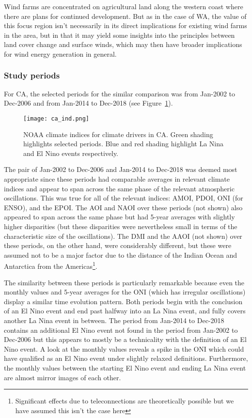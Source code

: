 Wind farms are concentrated on agricultural land along the western coast where there are plans for continued development. But as in the case of \ac{WA}, the value of this focus region isn't necessarily in its direct implications for existing wind farms in the area, but in that it may yield some insights into the principles between land cover change and surface winds, which may then have broader implications for wind energy generation in general.

\subsubsection{Study periods}
\label{sssec:period_seas_ca}

For \ac{CA}, the selected periods for the similar comparison was from Jan-2002 to Dec-2006 and from Jan-2014 to Dec-2018 (see Figure~\ref{fig:ca_ind}).

\begin{figure}[!ht]
	\centering
	\texttt{[image: ca\_ind.png]}
	\caption[CA's and SA's relevant climate indices for similar comparison]{\ac{NOAA} climate indices for climate drivers in \ac{CA}. Green shading highlights selected periods. Blue and red shading highlight La Nina and El Nino events respectively.}
	\label{fig:ca_ind}
\end{figure}

The pair of Jan-2002 to Dec-2006 and Jan-2014 to Dec-2018 was deemed most appropriate since these periods had comparable averages in relevant climate indices and appear to span across the same phase of the relevant atmospheric oscillations. This was true for all of the relevant indices: \ac{AMOI}, \ac{PDOI}, \ac{ONI} (for \ac{ENSO}), and the \ac{EPOI}. The \ac{AOI} and \ac{NAOI} over these periods (not shown) also appeared to span across the same phase but had 5-year averages with slightly higher disparities (but these disparities were nevertheless small in terms of the characteristic size of the oscillations). The \ac{DMI} and the \ac{AAOI} (not shown) over these periods, on the other hand, were considerably different, but these were assumed not to be a major factor due to the distance of the Indian Ocean and Antarctica from the Americas\footnote{Significant effects due to teleconnections are theoretically possible but we have assumed this isn't the case here}.

The similarity between these periods is particularly remarkable because even the monthly values and 5-year averages for the \ac{ONI} (which has irregular oscillations) display a similar time evolution pattern. Both periods begin with the conclusion of an El Nino event and end past halfway into an La Nina event, and fully covers another La Nina event in between. The period from Jan-2014 to Dec-2018 contains an additional El Nino event not found in the period from Jan-2002 to Dec-2006 but this appears to mostly be a technicality with the definition of an El Nino event. A look at the monthly values reveals a spike in the \ac{ONI} which could have qualified as an El Nino event under slightly relaxed definitions. Furthermore, the monthly values between the starting El Nino event and ending La Nina event are almost mirror images of each other.

